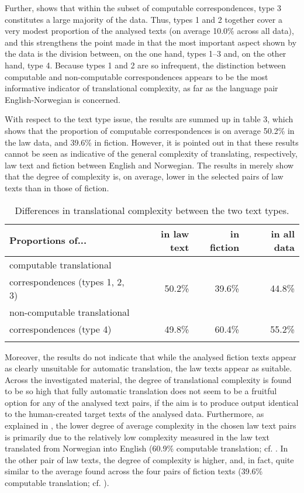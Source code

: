 \documentclass[output=paper]{LSP/langsci}
\begin{document}
\largerpage
Further,  shows that within the subset of computable correspondences, type 3 constitutes a large majority of the data. Thus, types 1 and 2 together cover a very modest proportion of the analysed texts (on average 10.0\% across all data), and this strengthens the point made in  that the most important aspect shown by the data is the division between, on the one hand, types 1--3 and, on the other hand, type 4. Because types 1 and 2 are so infrequent, the distinction between computable and non-computable correspondences appears to be the most informative indicator of translational complexity, as far as the language pair English-Norwegian is concerned.

With respect to the text type issue, the results are summed up in table 3, which shows that the proportion of computable correspondences is on average 50.2\% in the law data, and 39.6\% in fiction. However, it is pointed out in \citet[275]{Thunes2011} that these results cannot be seen as indicative of the general complexity of translating, respectively, law text and fiction between English and Norwegian. The results in  merely show that the degree of complexity is, on average, lower in the selected pairs of law texts than in those of fiction. 

\begin{table}
\begin{tabular}{lrrr}
\lsptoprule
Proportions of... & {in law text} & {in fiction} & {in all data}\\
\midrule
computable translational & {} & {} & {}\\
correspondences (types 1, 2, 3) & 50.2\% & 39.6\% & 44.8\%\\
non-computable translational & {} & {} & {}\\
correspondences (type 4) & 49.8\% & 60.4\% & 55.2\%\\
\lspbottomrule
\end{tabular}
\caption{Differences in translational complexity between the two text types.}
\label{tab:thunes:3}
\end{table}

Moreover, the results do not indicate that while the analysed fiction texts appear as clearly unsuitable for automatic translation, the law texts appear as suitable. Across the investigated material, the degree of translational complexity is found to be so high that fully automatic translation does not seem to be a fruitful option for any of the analysed text pairs, if the aim is to produce output identical to the human-created target texts of the analysed data. Furthermore, as explained in \citet[275]{Thunes2011}, the lower degree of average complexity in the chosen law text pairs is primarily due to the relatively low complexity measured in the law text translated from Norwegian into English (60.9\% computable translation; cf. \citet[291]{Thunes2011}. In the other pair of law texts, the degree of complexity is higher, and, in fact, quite similar to the average found across the four pairs of fiction texts (39.6\% computable translation; cf. ). 
\end{document}
